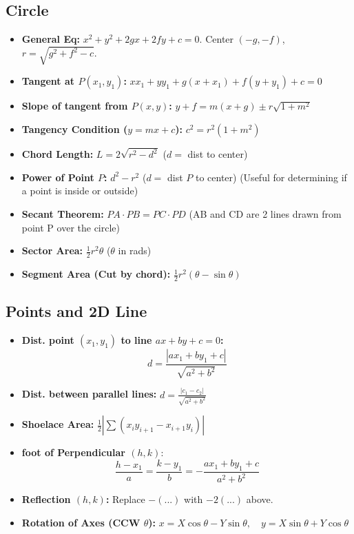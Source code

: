 \subsection{Circle}
\begin{itemize}[leftmargin=*]
    \item \textbf{General Eq:} $x^2+y^2+2gx+2fy+c=0$. Center $(-g, -f)$, $r=\sqrt{g^2+f^2-c}$.
    \item \textbf{Tangent at $P(x_1, y_1)$:} $xx_1 + yy_1 + g(x+x_1) + f(y+y_1) + c = 0$
    \item \textbf{Slope of tangent from $P(x, y)$:} $y + f = m(x + g) \pm r\sqrt{1 + m^2}$
    \item \textbf{Tangency Condition ($y=mx+c$):} $c^2 = r^2(1+m^2)$
    \item \textbf{Chord Length:} $L = 2\sqrt{r^2 - d^2}$ ($d = $ dist to center)
    \item \textbf{Power of Point $P$:} $d^2 - r^2$ ($d = $ dist $P$ to center) (Useful for determining if a point is inside or outside)
    \item \textbf{Secant Theorem:} $PA \cdot PB = PC \cdot PD$ (AB and CD are 2 lines drawn from point P over the circle)
    \item \textbf{Sector Area:} $\frac{1}{2}r^2\theta$ ($\theta$ in rads)
    \item \textbf{Segment Area (Cut by chord):} $\frac{1}{2}r^2(\theta - \sin\theta)$
\end{itemize}
\subsection{Points and 2D Line}
\begin{itemize}[leftmargin=*]
    \item \textbf{Dist. point $(x_1, y_1)$ to line $ax+by+c=0$:}
          \[ d = \frac{|ax_1+by_1+c|}{\sqrt{a^2+b^2}} \]
    \item \textbf{Dist. between parallel lines:} $d = \frac{|c_1-c_2|}{\sqrt{a^2+b^2}}$
    \item \textbf{Shoelace Area:} $\frac{1}{2} | \sum (x_i y_{i+1} - x_{i+1} y_i) |$
    \item \textbf{foot of Perpendicular $(h,k)$}:
          \[ \frac{h-x_1}{a} = \frac{k-y_1}{b} = -\frac{ax_1+by_1+c}{a^2+b^2} \]
    \item \textbf{Reflection $(h,k)$:} Replace $- (...)$ with $-2 (...)$ above.
    \item \textbf{Rotation of Axes (CCW $\theta$):}
          $x = X\cos\theta - Y\sin\theta, \quad y = X\sin\theta + Y\cos\theta$
\end{itemize}
